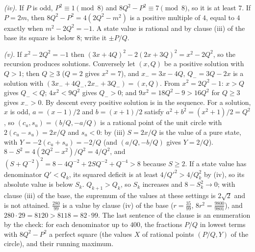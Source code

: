 \emph{(iv).} If $P$ is odd, $P^{2} \equiv 1 \pmod 8$ and $8Q^{2} - P^{2} \equiv 7 \pmod 8$, so it is at least $7$. If $P = 2m$, then $8Q^{2} - P^{2} = 4(2Q^{2} - m^{2})$ is a positive multiple of $4$, equal to $4$ exactly when $m^{2} - 2Q^{2} = -1$. A state value is rational and by clause (iii) of the base its square is below $8$; write it $\pm P/Q$.

\emph{(v).} If $x^{2} - 2Q^{2} = -1$ then $(3x + 4Q)^{2} - 2(2x + 3Q)^{2} = x^{2} - 2Q^{2}$, so the recursion produces solutions. Conversely let $(x, Q)$ be a positive solution with $Q > 1$; then $Q \ge 3$ ($Q = 2$ gives $x^{2} = 7$), and $x_{-} = 3x - 4Q$, $Q_{-} = 3Q - 2x$ is a solution with $(3x_{-} + 4Q_{-}, 2x_{-} + 3Q_{-}) = (x, Q)$. From $x^{2} = 2Q^{2} - 1$: $x > Q$ gives $Q_{-} < Q$; $4x^{2} < 9Q^{2}$ gives $Q_{-} > 0$; and $9x^{2} = 18Q^{2} - 9 > 16Q^{2}$ for $Q \ge 3$ gives $x_{-} > 0$. By descent every positive solution is in the sequence. For a solution, $x$ is odd, $a = (x - 1)/2$ and $b = (x + 1)/2$ satisfy $a^{2} + b^{2} = (x^{2} + 1)/2 = Q^{2}$, so $(c_{u}, s_{u}) = (b/Q, -a/Q)$ is a rational point of the unit circle with $2(c_{u} - s_{u}) = 2x/Q$ and $s_{u} < 0$: by (iii) $S = 2x/Q$ is the value of a pure state, with $Y = -2(c_{u} + s_{u}) = -2/Q$ (and $(a/Q, -b/Q)$ gives $Y = 2/Q$). $8 - S^{2} = 4(2Q^{2} - x^{2})/Q^{2} = 4/Q^{2}$, and $(S + Q^{-2})^{2} = 8 - 4Q^{-2} + 2SQ^{-2} + Q^{-4} > 8$ because $S \ge 2$. If a state value has denominator $Q' < Q_{k}$, its squared deficit is at least $4/Q'^{2} > 4/Q_{k}^{2}$ by (iv), so its absolute value is below $S_{k}$. $Q_{k+1} > Q_{k}$, so $S_{k}$ increases and $8 - S_{k}^{2} \to 0$; with clause (iii) of the base, the supremum of the values at these settings is $2\sqrt{2}$ and is not attained. $\tfrac{280}{99}$ is a value by clause (iv) of the base ($r = \tfrac{35}{99}$, $8r^{2} = \tfrac{9800}{9801}$), and $280 \cdot 29 = 8120 > 8118 = 82 \cdot 99$. The last sentence of the clause is an enumeration by the check: for each denominator up to $400$, the fractions $P/Q$ in lowest terms with $8Q^{2} - P^{2}$ a perfect square (the values $X$ of rational points $(P/Q, Y)$ of the circle), and their running maximum.
